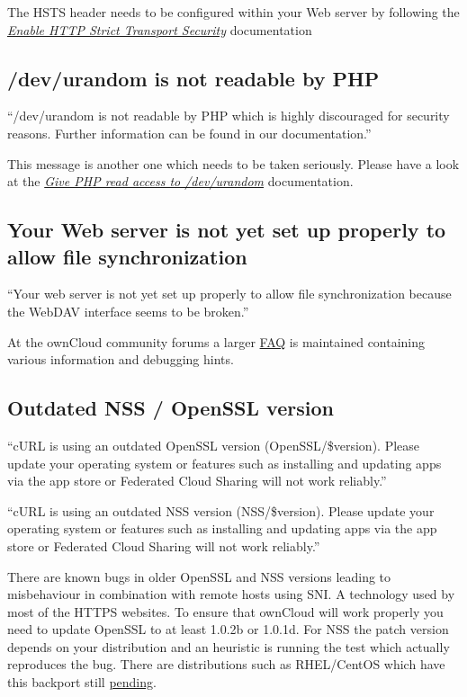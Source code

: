 \documentclass[letterpaper,10pt,english]{sphinxmanual}
\begin{document}
The HSTS header needs to be configured within your Web server by following the
{\hyperref[configuration_server/harden_server:enable-hsts-label]{\emph{Enable HTTP Strict Transport Security}}} documentation


\subsection{/dev/urandom is not readable by PHP}
\label{configuration_server/security_setup_warnings:dev-urandom-is-not-readable-by-php}
``/dev/urandom is not readable by PHP which is highly discouraged for security reasons.
Further information can be found in our documentation.''

This message is another one which needs to be taken seriously. Please have a look
at the {\hyperref[configuration_server/harden_server:dev-urandom-label]{\emph{Give PHP read access to /dev/urandom}}} documentation.


\subsection{Your Web server is not yet set up properly to allow file synchronization}
\label{configuration_server/security_setup_warnings:your-web-server-is-not-yet-set-up-properly-to-allow-file-synchronization}
``Your web server is not yet set up properly to allow file synchronization because
the WebDAV interface seems to be broken.''

At the ownCloud community forums a larger \href{https://central.owncloud.org/t/how-to-fix-caldav-carddav-webdav-problems/852}{FAQ}
is maintained containing various information and debugging hints.


\subsection{Outdated NSS / OpenSSL version}
\label{configuration_server/security_setup_warnings:outdated-nss-openssl-version}
``cURL is using an outdated OpenSSL version (OpenSSL/\$version). Please update your
operating system or features such as installing and updating apps via the app store
or Federated Cloud Sharing will not work reliably.''

``cURL is using an outdated NSS version (NSS/\$version). Please update your operating
system or features such as installing and updating apps via the app store or Federated
Cloud Sharing will not work reliably.''

There are known bugs in older OpenSSL and NSS versions leading to misbehaviour in
combination with remote hosts using SNI. A technology used by most of the HTTPS
websites. To ensure that ownCloud will work properly you need to update OpenSSL
to at least 1.0.2b or 1.0.1d. For NSS the patch version depends on your distribution
and an heuristic is running the test which actually reproduces the bug. There
are distributions such as RHEL/CentOS which have this backport still \href{https://bugzilla.redhat.com/show\_bug.cgi?id=1241172}{pending}.
\end{document}
